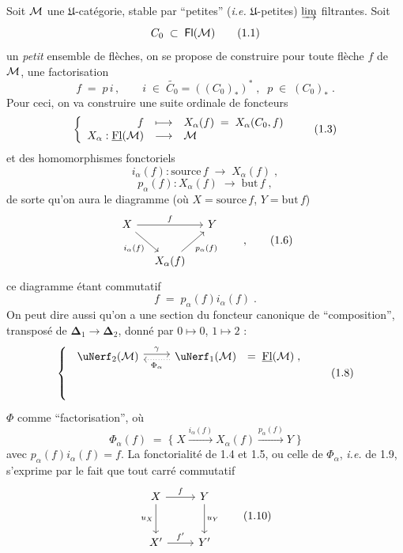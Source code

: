 Soit $\mathcal{M}$ une $\mathfrak{U}$-catégorie, stable par “petites” (\textit{i.e.} $\mathfrak{U}$-petites) $\varinjlim$ filtrantes. Soit
\[
C_0 \;\subset\; \Fl(\M)
\tag*{(1.1)}
\]
un \textit{petit} ensemble de flèches, on se propose de construire pour toute flèche $f$ de $\mathcal{M}$, une factorisation
\[
f \;=\; p\,i \,, \qquad i \;\in\; \widetilde{C_0} = ((C_0)_*)^* \;, \;\; p \;\in\; (C_0)_* \;.
\tag*{(1.2)}
\]
Pour ceci, on va construire une suite ordinale de foncteurs
\[
\left\{
\begin{array}{rcl}
f & \longmapsto & X_\alpha(f) \;=\; X_\alpha(C_0,f) \\
X_\alpha : \uFl(\M) & \longrightarrow & \M
\end{array}
\right.
\tag*{(1.3)}
\]
et des homomorphismes fonctoriels
\[
i_\alpha(f) : \mathrm{source}\, f \;\longrightarrow\; X_\alpha(f) \;,
\tag*{(1.4)}
\]
\[
p_\alpha(f) : X_\alpha(f) \;\longrightarrow\; \mathrm{but}\, f \;,
\tag*{(1.5)}
\]
de sorte qu'on aura le diagramme (où $X = \mathrm{source}\, f$, $Y = \mathrm{but}\, f$)
\[
\begin{tikzcd}[column sep=small]
X \arrow[rr, "f"] \arrow[dr, "i_\alpha(f)"'] & & Y \\
& X_\alpha(f) \arrow[ur, "p_\alpha(f)"'] &
\end{tikzcd}
\qquad ,
\tag*{(1.6)}
\]
ce diagramme étant commutatif
\[
f \;=\; p_\alpha(f) i_\alpha(f) \;.
\tag*{(1.7)}
\]
On peut dire aussi qu'on a une section du foncteur canonique de “composition”, transposé de $\boldsymbol{\Delta}_1 \longrightarrow \boldsymbol{\Delta}_2$, donné par $0 \longmapsto 0$, $1 \longmapsto 2$ :
\[
\left\{
\begin{array}{l}
\begin{tikzcd}[ampersand replacement=\&]
\uNerf_2(\M) \arrow[r, shift left, "\gamma"] \& \uNerf_1(\M) \arrow[l, dotted, shift left, "\Phi_\alpha"]
\end{tikzcd}
\;=\; \uFl(\M) \;, \\[1ex]
\\[1ex]
\\
\end{array}
\right.
\tag*{(1.8)}
\]
$\Phi$ comme “factorisation”,
où
\[
\Phi_\alpha(f) \;=\; \{\; X \xrightarrow{i_\alpha(f)} X_\alpha(f) \xrightarrow{p_\alpha(f)} Y \;\}
\tag*{(1.9)}
\]
avec $p_\alpha(f)i_\alpha(f) = f$. La fonctorialité de 1.4 et 1.5, ou celle de $\Phi_\alpha$, \textit{i.e.} de 1.9, s'exprime par le fait que tout carré commutatif
\[
\begin{tikzcd}[row sep=large]
X \arrow[r, "f"] \arrow[d, "u_X"'] & Y \arrow[d, "u_Y"] \\
X' \arrow[r, "{f'}"] & Y'
\end{tikzcd}
\tag*{(1.10)}
\]
